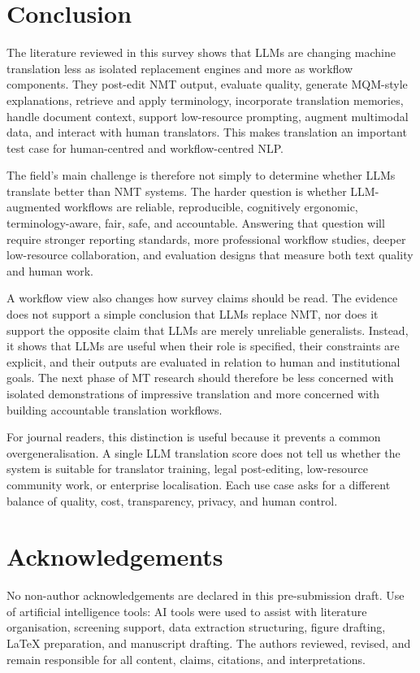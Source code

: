 \documentclass[11pt]{article}
\begin{document}
\section{Conclusion}
The literature reviewed in this survey shows that LLMs are changing machine translation less as isolated replacement engines and more as workflow components. They post-edit NMT output, evaluate quality, generate MQM-style explanations, retrieve and apply terminology, incorporate translation memories, handle document context, support low-resource prompting, augment multimodal data, and interact with human translators. This makes translation an important test case for human-centred and workflow-centred NLP.

The field's main challenge is therefore not simply to determine whether LLMs translate better than NMT systems. The harder question is whether LLM-augmented workflows are reliable, reproducible, cognitively ergonomic, terminology-aware, fair, safe, and accountable. Answering that question will require stronger reporting standards, more professional workflow studies, deeper low-resource collaboration, and evaluation designs that measure both text quality and human work.

A workflow view also changes how survey claims should be read. The evidence does not support a simple conclusion that LLMs replace NMT, nor does it support the opposite claim that LLMs are merely unreliable generalists. Instead, it shows that LLMs are useful when their role is specified, their constraints are explicit, and their outputs are evaluated in relation to human and institutional goals. The next phase of MT research should therefore be less concerned with isolated demonstrations of impressive translation and more concerned with building accountable translation workflows.

For journal readers, this distinction is useful because it prevents a common overgeneralisation. A single LLM translation score does not tell us whether the system is suitable for translator training, legal post-editing, low-resource community work, or enterprise localisation. Each use case asks for a different balance of quality, cost, transparency, privacy, and human control.

\section*{Acknowledgements}
No non-author acknowledgements are declared in this pre-submission draft. Use of artificial intelligence tools: AI tools were used to assist with literature organisation, screening support, data extraction structuring, figure drafting, LaTeX preparation, and manuscript drafting. The authors reviewed, revised, and remain responsible for all content, claims, citations, and interpretations.
\end{document}
